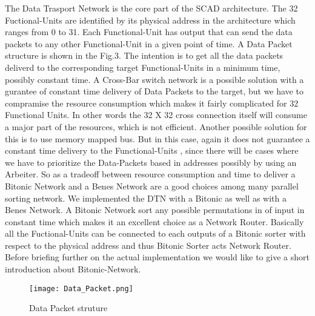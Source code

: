 		The Data Trasport Network is the core part of the SCAD architecture. The 32 Fuctional-Units are identified by its physical address in the architecture which ranges from 0 to 31. Each Functional-Unit has output 
		that can send the data packets to any other Functional-Unit in a given point of time. A Data Packet structure is shown in the Fig.3. The intention is to get all the data packets deliverd to the 
		corresponding target Functional-Units in a minimum time, possibly constant time. A Cross-Bar switch network is a possible solution with a gurantee of constant time delivery of Data Packets to the target,
		but we have to compramise the resource consumption which makes it fairly complicated for 32 Functional Units. In other words the 32 X 32 cross connection itself will consume a major part of the resources, 
		which is not efficient. Another possible solution for this is to use memory mapped bus. But in this case, again it does not guarantee a constant time delivery to the 
		Functional-Units , since there will be cases where we have to prioritize the Data-Packets based in addresses possibly by using an Arbeiter. So as a tradeoff between resource consumption and time to deliver
		a Bitonic Network and a Benes Network are a good choices among many parallel sorting network. We implemented the DTN with a Bitonic as well as with a Benes Network. 
		A Bitonic Network sort any possible permutations in of input in constant time which makes it an excellent choice as a Network Router.
		Basically all the Fuctional-Units can be connected to each outputs of a Bitonic sorter with respect to the physical address and thus Bitonic Sorter acts Network Router. Before briefing further on the actual implementation
		we would like to give a short introduction about Bitonic-Network.

			\begin{figure}[!ht]
				\texttt{[image: Data\_Packet.png]}
				\caption{Data Packet struture}
			\end{figure}

